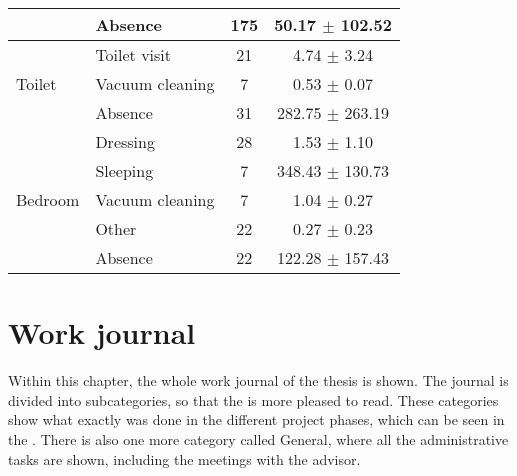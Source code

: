 \begin{table}[htbp]
\begin{tabular}{l|l|c|c}
        & Absence & 175 & 50.17 $\pm$ 102.52 \\
        \midrule[1pt]
        \multirow{3}{*}{Toilet} & Toilet visit & 21 & 4.74 $\pm$ 3.24 \\
        \cline{2-4}
        & Vacuum cleaning & 7 & 0.53 $\pm$ 0.07 \\
        \cline{2-4}
        & Absence & 31 & 282.75 $\pm$ 263.19 \\
        \midrule[1pt]
        \multirow{5}{*}{Bedroom} & Dressing & 28 & 1.53 $\pm$ 1.10 \\
        \cline{2-4}
        & Sleeping & 7 & 348.43 $\pm$ 130.73 \\
        \cline{2-4}
        & Vacuum cleaning & 7 & 1.04 $\pm$ 0.27 \\
        \cline{2-4}
        & Other & 22 & 0.27 $\pm$ 0.23 \\
        \cline{2-4}
        & Absence & 22 & 122.28 $\pm$ 157.43 \\
        \bottomrule
    \end{tabular}
\end{table}

\chapter{Work journal}
\label{app:Work-Journal}

Within this chapter, the whole work journal of the thesis is shown. The journal is divided into subcategories, so that the  is more pleased to read. These categories show what exactly was done in the different project phases, which can be seen in the . There is also one more category called \flqq General\frqq, where all the administrative tasks are shown, including the meetings with the advisor.

\clearpage
\landscapevalues

